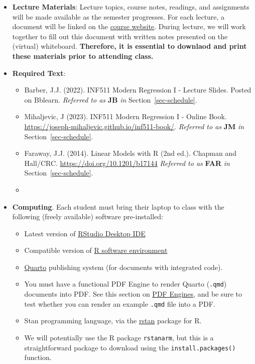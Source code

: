 \documentclass[
  letterpaper,
  DIV=11,
  numbers=noendperiod]{scrreprt}
\providecommand{\tightlist}{%
  \setlength{\itemsep}{0pt}\setlength{\parskip}{0pt}}\usepackage{longtable,booktabs,array}
\begin{document}
\begin{itemize}
\item
  \textbf{Lecture Materials}: Lecture topics, course notes, readings,
  and assignments will be made available as the semester progresses. For
  each lecture, a document will be linked on the
  \href{https://joseph-mihaljevic.github.io/inf511-book/}{course
  website}. During lecture, we will work together to fill out this
  document with written notes presented on the (virtual) whiteboard.
  \textbf{Therefore, it is essential to downlaod and print these
  materials prior to attending class.}
\item
  \textbf{Required Text}:

  \begin{itemize}
  \tightlist
  \item
    Barber, J.J. (2022). INF511 Modern Regression I - Lecture Slides.
    Posted on Bblearn. \emph{Referred to as} \textbf{JB} \emph{in}
    Section~\ref{sec-schedule}.
  \item
    Mihaljevic, J (2023). INF511 Modern Regression I - Online Book.
    \url{https://joseph-mihaljevic.github.io/inf511-book/}.
    \emph{Referred to as} \textbf{JM} \emph{in}
    Section~\ref{sec-schedule}.
  \item
    Faraway, J.J. (2014). Linear Models with R (2nd ed.). Chapman and
    Hall/CRC. \url{https://doi.org/10.1201/b17144} \emph{Referred to as}
    \textbf{FAR} \emph{in} Section~\ref{sec-schedule}.
  \item
  \end{itemize}
\item
  \textbf{Computing}. Each student must bring their laptop to class with
  the following (freely available) software pre-installed:

  \begin{itemize}
  \tightlist
  \item
    Latest version of \href{https://posit.co/downloads/}{RStudio Desktop
    IDE}
  \item
    Compatible version of \href{https://ftp.osuosl.org/pub/cran/}{R
    software environment}
  \item
    \href{https://quarto.org/docs/get-started/}{Quarto} publishing
    system (for documents with integrated code).
  \item
    You must have a functional PDF Engine to render Quarto
    (\texttt{.qmd}) documents into PDF. See this section on
    \href{https://quarto.org/docs/output-formats/pdf-engine.html}{PDF
    Engines}, and be sure to test whether you can render an example
    \texttt{.qmd} file into a PDF.
  \item
    Stan programming language, via the
    \href{https://mc-stan.org/users/interfaces/rstan.html}{rstan}
    package for R.
  \item
    We will potentially use the R package \texttt{rstanarm}, but this is
    a straightforward package to download using the
    \texttt{install.packages()} function.
  \end{itemize}
\end{itemize}
\end{document}
